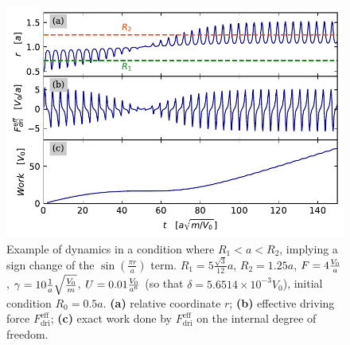 
\begin{figure}
\begin{center}
    \centering
    \includegraphics[width=1\linewidth]{Images/12_a.pdf}
    \caption{Example of dynamics in a condition where $R_1 < a < R_2$, implying a sign change of the $\sin \left(\frac{\pi r}{a}\right)$ term. $R_1 = 5\frac{\sqrt{3}}{12} a$, $R_2 = 1.25 a$,  $F = 4 \frac{V_0}{a}$, $\gamma = 10 \frac{1}{a}\sqrt{\frac{V_0}{m}}$, $ U = 0.01 \frac{V_0}{a^6}$ (so that $\delta = 5.6514 \times 10^{-3} V_0$), initial condition $R_0= 0.5 a$. \textbf{(a)} relative coordinate $r$; \textbf{(b)} effective driving force $F_{\text{dri}}^{\text{eff}}$; \textbf{(c)} exact work done by $F_\text{dri}^{\text{eff}}$ on the internal degree of freedom. }
    \label{Fig:12_a}
\end{center}
\end{figure}

